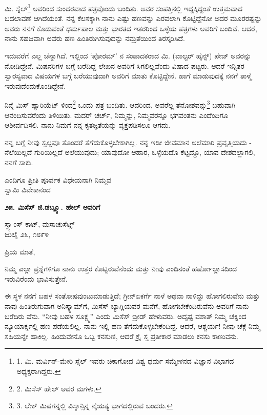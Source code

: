 ಮಿ. ಸ್ನೆಲ್\footnote{1. ಮಿ. ಮರ್ವಿನ್-ಮೇರಿ ಸ್ನೆಲ್ ಇವರು ಚಿಕಾಗೋದ ವಿಶ್ವ ಧರ್ಮ ಸಮ್ಮೇಳನದ ವಿಜ್ಞಾನ ವಿಭಾಗದ ಅಧ್ಯಕ್ಷರಾಗಿದ್ದರು.} ಅವರಿಂದ ಸುಂದರವಾದ ಪತ್ರವೊಂದು ಬಂದಿತು. ಅವರ ಸಂಪತ್ತಿನಲ್ಲಿ ಇದ್ದಕ್ಕಿದ್ದಂತೆ ಉತ್ತಮವಾದ ಬದಲಾವಣೆ ಆಗಿದೆಯಂತೆ. ನನ್ನ ಕೆಲಸಕ್ಕಾಗಿ ನಾನು ಎಷ್ಟು ಹಣವನ್ನು ಎರವಲಾಗಿ ಕೊಟ್ಟಿದ್ದೆನೋ ಅದರ ಮೂರರಷ್ಟನ್ನು ಅವರು ನನಗೆ ಕೊಡುವಂತೆ ಧರ್ಮಪಾಲ ಮತ್ತು ಭಾರತದ ಇತರರಿಂದ ಒಳ್ಳೆಯ ಪತ್ರಗಳು ಅವರಿಗೆ ಬಂದಿವೆ. ಆದರೆ, ನಾನು ಸಹಜವಾಗಿ ಅವರು ಹಣ ಹಿಂತಿರುಗಿಸುವುದನ್ನು ನಮ್ರತೆಯಿಂದ ತಿರಸ್ಕರಿಸಿದೆ.

ಇದುವರೆಗೆ ಎಲ್ಲ ಚೆನ್ನಾಗಿದೆ. ಇಲ್ಲಿಂದ ‘ಪೋರಮ್​’ ನ ಸಂಪಾದಕರಾದ ಮಿ. (ವಾಲ್ಟರ್ ಹೈನ್ಸ್) ಪೇಜ್ ಅವರನ್ನು ನೋಡಿದ್ದೇನೆ. ಮಿಷನರಿಗಳ ಬಗ್ಗೆ ಬರೆದಿದ್ದ ಲೇಖನ ಅವರಿಗೆ ಸಿಗಲಿಲ್ಲವೆಂದು ವಿಷಾದ ಪಟ್ಟರು. ಆದರೆ ಇನ್ನಿತರ ಸ್ವಾರಸ್ಯವಾದ ವಿಷಯಗಳ ಬಗ್ಗೆ ಬರೆಯುವುದಾಗಿ ಅವರಿಗೆ ಮಾತು ಕೊಟ್ಟಿದ್ದೇನೆ. ಹಾಗೆ ಮಾಡುವುದಕ್ಕೆ ನನಗೆ ತಾಳ್ಮೆ ಇರುವುದೆಂದುಕೊಂಡಿದ್ದೇನೆ.

ನಿನ್ನೆ ಮಿಸ್ ಹ್ಯಾರಿಯೆಟ್ ಳಿಂದ\footnote{2. ಮಿಸೆಸ್ ಹೇಲ್ ಅವರ ಮಗಳು.} ಒಂದು ಪತ್ರ ಬಂದಿತು. ಆದರಿಂದ, ಅವರೆಲ್ಲ ತೆನೋಶವನ್ನು\footnote{3. ಲೇಕ್ ಮಿಷಗನ್ನಲ್ಲಿ ವಿಸ್ಕಾನ್ಸಿನ್ನ ನೈಋತ್ಯ ಭಾಗದಲ್ಲಿರುವ ಬಂದರು.} ಬಹುವಾಗಿ ಆನಂದಿಸುವರೆಂದು ತಿಳಿಯಿತು. ಮದರ್ ಚರ್ಚ್, ನಿಮ್ಮನ್ನು, ನಿಮ್ಮವರನ್ನೂ ಭಗವಂತನು ಎಂದೆಂದಿಗೂ ಆಶೀರ್ವದಿಸಲಿ. ನಾನು ನಿಮಗೆ ನನ್ನ ಕೃತಜ್ಞತೆಯನ್ನು ವ್ಯಕ್ತಪಡಿಸಲೂ ಆಗದು.

ನನ್ನ ಬಗ್ಗೆ ನೀವು ಸ್ವಲ್ಪವೂ ತೊಂದರೆ ತೆಗೆದುಕೊಳ್ಳಬೇಕಾಗಿಲ್ಲ. ನನ್ನ ಇಡೀ ಜೀವಮಾನ ಅಲೆಮಾರಿ ಪ್ರವೃತ್ತಿಯದು - ನೆಲೆಯಿಲ್ಲದೆ ಗುರಿಯಿಲ್ಲದೆ ಅಲೆಯುವುದು; ಯಾವುದೋ ಆಹಾರ, ಒಳ್ಳೆಯದೊ ಕೆಟ್ಟದ್ದೊ, ಯಾವ ದೇಶದಲ್ಲಾಗಲಿ, ನನಗೆ ಸಾಕು.

\begin{flushright}
ಎಂದಿಗೂ ಪ್ರೀತಿ ಪೂರ್ವಕ ವಿಧೇಯನಾಗಿ ನಿಮ್ಮವ\\ಸ್ವಾಮಿ ವಿವೇಕಾನಂದ
\end{flushright}

\begin{center}
\textbf{೨೫. ಮಿಸೆಸ್ ಜಿ.ಡಬ್ಲ್ಯೂ. ಹೇಲ್ ಅವರಿಗೆ}
\end{center}

\begin{flushright}
ಸ್ವ್ಯಾಂಸ್ ಕಾಟ್, ಮಸಾಚುಸೆಟ್ಸ್\\ಜುಲೈ ೨೩, ೧೮೯೪
\end{flushright}

ಪ್ರಿಯ ಮಾತೆ,

ನಿಮ್ಮ ಎಲ್ಲಾ ಪ್ರಶ್ನೆಗಳಿಗೂ ನಾನು ಉತ್ತರ ಕೊಟ್ಟಿರುವೆನೆಂದು ಮತ್ತು ನೀವು ಎಂದಿನಂತೆ ಹರ್ಷೋಲ್ಲಾಸದಿಂದ ಇರುವಿರೆಂದು ಭಾವಿಸುತ್ತೇನೆ.

ಈ ಸ್ಥಳ ನನಗೆ ಬಹಳ ಸಂತೋಷವುಂಟುಮಾಡುತ್ತಿದೆ; ಗ್ರೀನ್ಏಕರ್ಗೆ ನಾಳೆ ಅಥವಾ ನಾಳಿದ್ದು ಹೋಗಲಿರುವೆನು ಮತ್ತು ನಾವು ಹಿಂತಿರುಗುವಾಗ ಅನಿಸ್ಕ್ವಾಮ್​ಗೆ, ಮಿಸೆಸ್ ಬ್ಯಾಗ್ಲಿಯವರ ಮನೆಗೆ, ಹೋಗಬೇಕೆಂದಿರುವೆನು-ಅವರಿಗೆ ನಾನು ಬರೆದಿರು ವೆನು. “ನೀವು ಬಹಳ ಸೂಕ್ಷ್ಮ” ಎಂದು ಮಿಸೆಸ್ ಬ್ರೀಡ್ ಹೇಳುವರು. ಅದೃಷ್ಟ ವಶಾತ್ ನಿಮ್ಮ ಚೆಕ್ನಿಂದ ನ್ಯೂಯಾರ್ಕ್ನಲ್ಲಿ ಹಣ ಪಡೆಯಲಿಲ್ಲ. ನಾನು ಇಲ್ಲಿ ಹಣ ತೆಗೆದುಕೊಳ್ಳಬೇಕೆಂದಿದ್ದೆ. ಆದರೆ, ಆಶ್ಚರ್ಯ! ನೀವು ಚೆಕ್ಗೆ ನಿಮ್ಮ ಸಹಿಯನ್ನೇ ಹಾಕಿಲ್ಲ. ಹಿಂದುವೇನೊ ಒಬ್ಬ ಕನಸುಣಿ, ಆದರೆ ಕ್ರೈ ಸ್ತ ಪ್ರತೀಕಾರ ಮಾಡಲು ಕನಸು ಕಾಣುವನು.


